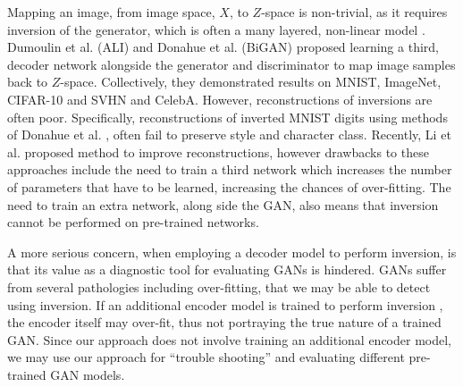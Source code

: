 \documentclass[journal]{IEEEtran}
\begin{document}
Mapping an image, from image space, $X$, to $Z$-space is non-trivial, as it requires inversion of the generator, which is often a many layered, non-linear model \cite{radford2015unsupervised, goodfellow2014generative, chen2016infogan}. Dumoulin et al. \cite{dumoulin2016adversarially} (ALI) and Donahue et al. (BiGAN) \cite{donahue2016adversarial} proposed learning a third, decoder network alongside the generator and discriminator to map image samples back to $Z$-space. Collectively, they demonstrated results on MNIST, ImageNet, CIFAR-10 and SVHN and CelebA. However, reconstructions of inversions are often poor. Specifically, reconstructions of inverted MNIST digits using methods of Donahue et al. \cite{donahue2015long}, often fail to preserve style and character class. Recently, Li et al. \cite{li2017alice} proposed method to improve reconstructions, however drawbacks to these approaches \cite{li2017alice, donahue2016adversarial, dumoulin2016adversarially} include the need to train a third network which increases the number of parameters that have to be learned, increasing the chances of over-fitting. The need to train an extra network, along side the GAN, also means that inversion cannot be performed on pre-trained networks.

A more serious concern, when employing a decoder model to perform inversion, is that its value as a diagnostic tool for evaluating GANs is hindered. GANs suffer from several pathologies including over-fitting, that we may be able to detect using inversion. If an additional encoder model is trained to perform inversion \cite{li2017alice, donahue2016adversarial, dumoulin2016adversarially,luo2017learning}, the encoder itself may over-fit, thus not portraying the true nature of a trained GAN. Since our approach does not involve training an additional encoder model, we may use our approach for ``trouble shooting'' and evaluating different pre-trained GAN models. 




\end{document}

